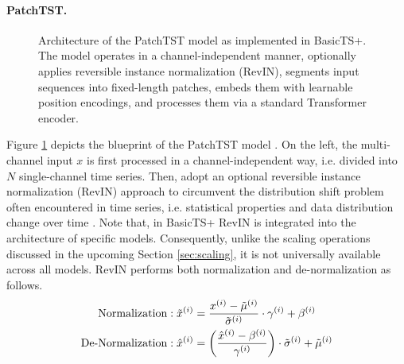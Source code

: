 \documentclass[a4paper,oneside,bibliography=totoc]{scrbook}
\begin{document}
\paragraph{PatchTST.}
\begin{figure}
    \centering
    \caption{Architecture of the PatchTST model as implemented in BasicTS+. The model operates in a channel-independent manner, optionally applies reversible instance normalization (RevIN), segments input sequences into fixed-length patches, embeds them with learnable position encodings, and processes them via a standard Transformer encoder.}
    \label{fig:Patchtst}
\end{figure}
Figure \ref{fig:Patchtst} depicts the blueprint of the PatchTST model \cite{nie_time_2022}. 
On the left, the multi-channel input $x$ is first processed in a channel-independent way, i.e. divided into $N$ single-channel time series.
Then, \citet{nie_time_2022} adopt an optional reversible instance normalization (RevIN) approach \cite{kim_reversible_2021} to circumvent the distribution shift problem often encountered in time series, i.e. statistical properties and data distribution change over time \cite{chen_calibration_2024}.
Note that, in BasicTS+ RevIN is integrated into the architecture of specific models. Consequently, unlike the scaling operations discussed in the upcoming Section \ref{sec:scaling}, it is not universally available across all models. RevIN performs both normalization and de-normalization as follows.
\begin{align}
\text{Normalization}: \space \tilde{x}^{(i)} &= \frac{x^{(i)} - \tilde{\mu}^{(i)}}{\tilde{\sigma}^{(i)}} \cdot \gamma^{(i)} + \beta^{(i)}\notag\\
 \text{De-Normalization}: \space \hat{x}^{(i)} &= \left( \frac{\hat{x}^{(i)} - \beta^{(i)}}{\gamma^{(i)}} \right) \cdot \tilde{\sigma}^{(i)} + \tilde{\mu}^{(i)}
\label{eq:revin}
\end{align}
\end{document}
